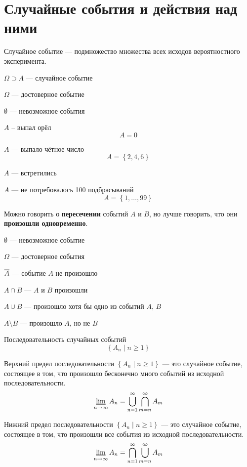 \section{Случайные события и действия над ними}
\begin{definition}
Случайное событие --- подмножество множества всех исходов
вероятностного эксперимента.
\end{definition}
$\Omega \supset A$ --- случайное событие

$\Omega$ --- достоверное событие

$\emptyset$ --- невозможное события

\begin{example}
$A$ -- выпал орёл
$$A={0}$$
\end{example}
\begin{example}
$A$ --- выпало чётное число
$$A = \left\{ 2,4,6 \right\}$$
\end{example}
\begin{example}
$A$ --- встретились
\end{example}
\begin{example}
$A$ --- не потребовалось 100 подбрасываний
$$A = \left\{ 1, \dots ,99 \right\}$$
\end{example}

Можно говорить о \textbf{пересечении} событий $A$ и $B$,
но лучше говорить, что они \textbf{произошли одновременно}.

$\emptyset$ --- невозможное событие

$\Omega$ --- достоверное события

$\overline{A}$ --- событие $A$ не произошло

$A\cap B$ --- $A$ и $B$ произошли

$A\cup B$ --- произошло хотя бы одно из событий $A$, $B$

$A\setminus B$ --- произошло $A$, но не $B$

\begin{definition}
Последовательность случайных событий
$$\left\{A_n\mid n\geq 1\right\}$$
\end{definition}
\begin{definition}
Верхний предел последовательности $\left\{A_n\mid n\geq 1\right\}$ --- это
случайное событие, состоящее в том, что произошло бесконечно много событий
из исходной последовательности.
$$\varliminf_{n \to \infty} A_n
= \bigcup_{n=1}^{\infty} \bigcap_{m=n}^{\infty} A_m $$
\end{definition}
\begin{definition}
Нижний предел последовательности $\left\{A_n\mid n\geq 1\right\}$ --- это
случайное событие, состоящее в том, что произошли все события
из исходной последовательности.
$$ \varliminf_{n \to \infty} A_n
= \bigcap_{n=1}^{\infty} \bigcup_{m=n}^{\infty} A_m $$
\end{definition}

